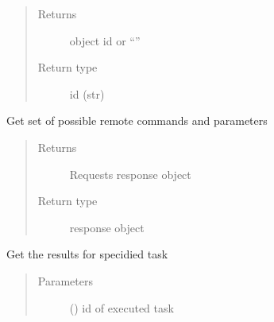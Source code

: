 \documentclass[letterpaper,10pt,english]{sphinxmanual}
\begin{document}
\begin{fulllineitems}
\begin{fulllineitems}
\begin{quote}
\begin{description}
\begin{itemize}
\end{itemize}

\item[{Returns}] \leavevmode
\sphinxAtStartPar
object id or “”

\item[{Return type}] \leavevmode
\sphinxAtStartPar
id (str)

\end{description}\end{quote}

\end{fulllineitems}


\begin{fulllineitems}
\label{\detokenize{b1diagnostics-class:bloxone.b1diagnostics.get_remote_commands}}
\sphinxAtStartPar
Get set of possible remote commands and parameters
\begin{quote}\begin{description}
\item[{Returns}] \leavevmode
\sphinxAtStartPar
Requests response object

\item[{Return type}] \leavevmode
\sphinxAtStartPar
response object

\end{description}\end{quote}

\end{fulllineitems}


\begin{fulllineitems}
\label{\detokenize{b1diagnostics-class:bloxone.b1diagnostics.get_task_result}}
\sphinxAtStartPar
Get the results for specidied task
\begin{quote}\begin{description}
\item[{Parameters}] \leavevmode
\sphinxAtStartPar
{} () \textendash{} id of executed task


\end{description}
\end{quote}
\end{fulllineitems}
\end{fulllineitems}
\end{document}
